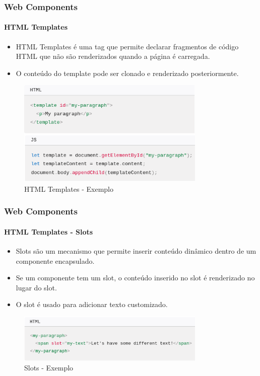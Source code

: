 \documentclass[
	9pt, %
	t, %
]{beamer}
\begin{document}
\begin{frame}
	\frametitle{Web Components}
	\framesubtitle{HTML Templates}
	\begin{itemize}
		\item HTML Templates é uma tag que permite declarar fragmentos de código HTML que não
		      são renderizados quando a página é carregada.
		\item O conteúdo do template pode ser clonado e renderizado posteriormente.
	\end{itemize}

	\begin{figure}
		\centering
		\includegraphics[width=0.8\textwidth]{html_templates.png}
		\caption{HTML Templates - Exemplo}
	\end{figure}

\end{frame}

\begin{frame}
	\frametitle{Web Components}
	\framesubtitle{HTML Templates - Slots}
	\begin{itemize}
		\item Slots são um mecanismo que permite inserir conteúdo dinâmico dentro de um
		      componente encapsulado.
		\item Se um componente tem um slot, o conteúdo inserido no slot é renderizado no
		      lugar do slot.
		\item O slot é usado para adicionar texto customizado.
	\end{itemize}

	\begin{figure}
		\centering
		\includegraphics[width=0.8\textwidth]{html_slots.png}
		\caption{Slots - Exemplo}
	\end{figure}

\end{frame}
\end{document}
